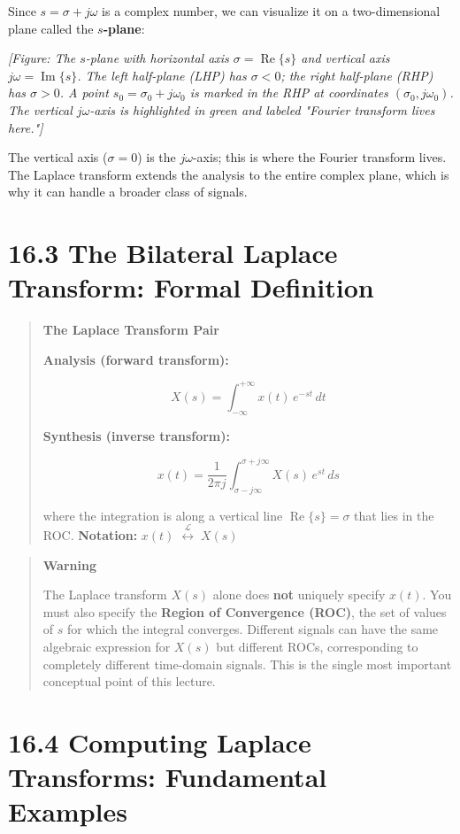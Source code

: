 \documentclass[11pt]{article}
\begin{document}
Since $s = \sigma + j\omega$ is a complex number, we can visualize it on a two-dimensional plane called the \textbf{$s$-plane}:

\textit{[Figure: The $s$-plane with horizontal axis $\sigma = \operatorname{Re}\{s\}$ and vertical axis $j\omega = \operatorname{Im}\{s\}$. The left half-plane (LHP) has $\sigma < 0$; the right half-plane (RHP) has $\sigma > 0$. A point $s_0 = \sigma_0 + j\omega_0$ is marked in the RHP at coordinates $(\sigma_0, j\omega_0)$. The vertical $j\omega$-axis is highlighted in green and labeled "Fourier transform lives here."]}

The vertical axis ($\sigma = 0$) is the $j\omega$-axis; this is where the Fourier transform lives. The Laplace transform extends the analysis to the entire complex plane, which is why it can handle a broader class of signals.

\section*{16.3 The Bilateral Laplace Transform: Formal Definition}

\begin{quote}
\textbf{The Laplace Transform Pair}

\textbf{Analysis (forward transform):}

\[X(s) = \int_{-\infty}^{+\infty} x(t)\,e^{-st}\,dt\]

\textbf{Synthesis (inverse transform):}

\[x(t) = \frac{1}{2\pi j} \int_{\sigma - j\infty}^{\sigma + j\infty} X(s)\,e^{st}\,ds\]

where the integration is along a vertical line $\operatorname{Re}\{s\} = \sigma$ that lies in the ROC.
\textbf{Notation:} $x(t) \;\overset{\mathcal{L}}{\longleftrightarrow}\; X(s)$
\end{quote}

\begin{quote}
\textbf{Warning}

The Laplace transform $X(s)$ alone does \textbf{not} uniquely specify $x(t)$. You must also specify the \textbf{Region of Convergence (ROC)}, the set of values of $s$ for which the integral converges. Different signals can have the same algebraic expression for $X(s)$ but different ROCs, corresponding to completely different time-domain signals. This is the single most important conceptual point of this lecture.
\end{quote}

\section*{16.4 Computing Laplace Transforms: Fundamental Examples}
\end{document}

